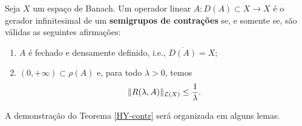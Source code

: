 \begin{theorem}\label{HY-contr}
Seja $X$ um espaço de Banach. Um operador linear $A:D(A)\subset X\longrightarrow X$ é o gerador infinitesimal de um 
\textbf{semigrupos de contrações} se, e somente se, são válidas as seguintes afirmações:
\begin{enumerate}[$(i)$]
\item $A$ é fechado e densamente definido, i.e., $\overline{D(A)}=X$; 
\item $(0,+\infty)\subset \rho(A)$ e, para todo $\lambda>0$, temos
\begin{equation*}
\|R(\lambda,A)\|_{\mathcal{L}(X)}\leq \frac{1}{\lambda}.
\end{equation*}
\end{enumerate}
\end{theorem}

A demonstração do Teorema \ref{HY-contr} será organizada em alguns lemas.

